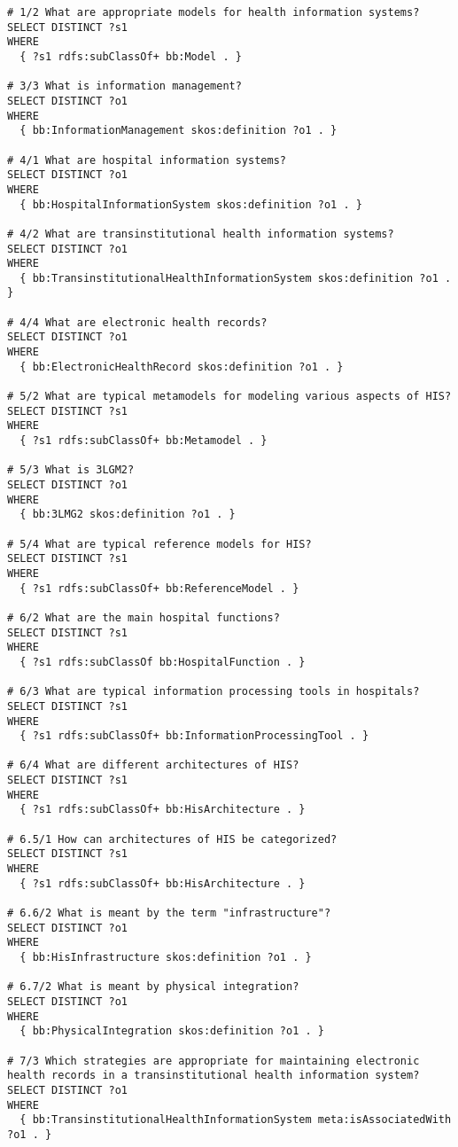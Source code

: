 \begin{lstlisting}[language=SPARQL]
# 1/2 What are appropriate models for health information systems?
SELECT DISTINCT ?s1
WHERE
  { ?s1 rdfs:subClassOf+ bb:Model . }

# 3/3 What is information management?
SELECT DISTINCT ?o1
WHERE
  { bb:InformationManagement skos:definition ?o1 . }

# 4/1 What are hospital information systems?
SELECT DISTINCT ?o1
WHERE
  { bb:HospitalInformationSystem skos:definition ?o1 . }

# 4/2 What are transinstitutional health information systems?
SELECT DISTINCT ?o1
WHERE
  { bb:TransinstitutionalHealthInformationSystem skos:definition ?o1 . }

# 4/4 What are electronic health records?
SELECT DISTINCT ?o1
WHERE
  { bb:ElectronicHealthRecord skos:definition ?o1 . }

# 5/2 What are typical metamodels for modeling various aspects of HIS?
SELECT DISTINCT ?s1
WHERE
  { ?s1 rdfs:subClassOf+ bb:Metamodel . }

# 5/3 What is 3LGM2?
SELECT DISTINCT ?o1
WHERE
  { bb:3LMG2 skos:definition ?o1 . }

# 5/4 What are typical reference models for HIS?
SELECT DISTINCT ?s1
WHERE
  { ?s1 rdfs:subClassOf+ bb:ReferenceModel . }

# 6/2 What are the main hospital functions?
SELECT DISTINCT ?s1
WHERE
  { ?s1 rdfs:subClassOf bb:HospitalFunction . }

# 6/3 What are typical information processing tools in hospitals?
SELECT DISTINCT ?s1
WHERE
  { ?s1 rdfs:subClassOf+ bb:InformationProcessingTool . }

# 6/4 What are different architectures of HIS?
SELECT DISTINCT ?s1
WHERE
  { ?s1 rdfs:subClassOf+ bb:HisArchitecture . }

# 6.5/1 How can architectures of HIS be categorized?
SELECT DISTINCT ?s1
WHERE
  { ?s1 rdfs:subClassOf+ bb:HisArchitecture . }

# 6.6/2 What is meant by the term "infrastructure"?
SELECT DISTINCT ?o1
WHERE
  { bb:HisInfrastructure skos:definition ?o1 . }

# 6.7/2 What is meant by physical integration?
SELECT DISTINCT ?o1
WHERE
  { bb:PhysicalIntegration skos:definition ?o1 . }

# 7/3 Which strategies are appropriate for maintaining electronic health records in a transinstitutional health information system?
SELECT DISTINCT ?o1
WHERE
  { bb:TransinstitutionalHealthInformationSystem meta:isAssociatedWith ?o1 . }


\end{lstlisting}
